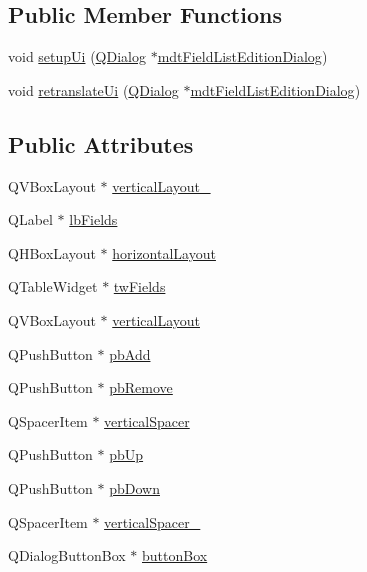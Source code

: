 \subsection*{Public Member Functions}
\begin{DoxyCompactItemize}
\item 
void \hyperlink{class_ui__mdt_field_list_edition_dialog_a4662dc90befa58da4568df605a7d26c9}{setup\-Ui} (\hyperlink{class_q_dialog}{Q\-Dialog} $\ast$\hyperlink{classmdt_field_list_edition_dialog}{mdt\-Field\-List\-Edition\-Dialog})
\item 
void \hyperlink{class_ui__mdt_field_list_edition_dialog_ac60ef5646ffc3019728f695a0b7cb2fd}{retranslate\-Ui} (\hyperlink{class_q_dialog}{Q\-Dialog} $\ast$\hyperlink{classmdt_field_list_edition_dialog}{mdt\-Field\-List\-Edition\-Dialog})
\end{DoxyCompactItemize}
\subsection*{Public Attributes}
\begin{DoxyCompactItemize}
\item 
Q\-V\-Box\-Layout $\ast$ \hyperlink{class_ui__mdt_field_list_edition_dialog_a4dfd8640ff6bd98a984e6e3180fa8dfb}{vertical\-Layout\-\_}
\item 
Q\-Label $\ast$ \hyperlink{class_ui__mdt_field_list_edition_dialog_aaa32a5c19424edcc47eb0939e7268f45}{lb\-Fields}
\item 
Q\-H\-Box\-Layout $\ast$ \hyperlink{class_ui__mdt_field_list_edition_dialog_a1803b58ae2f7ca22757db159d0c1c580}{horizontal\-Layout}
\item 
Q\-Table\-Widget $\ast$ \hyperlink{class_ui__mdt_field_list_edition_dialog_ab2c5007bf0c170cb34932ce743889b05}{tw\-Fields}
\item 
Q\-V\-Box\-Layout $\ast$ \hyperlink{class_ui__mdt_field_list_edition_dialog_ae01322016bbd7a90b42580eac4cef162}{vertical\-Layout}
\item 
Q\-Push\-Button $\ast$ \hyperlink{class_ui__mdt_field_list_edition_dialog_a98c057b1d437b4000da90eacacdc8f5f}{pb\-Add}
\item 
Q\-Push\-Button $\ast$ \hyperlink{class_ui__mdt_field_list_edition_dialog_a99ff300636037c36c9930d00b97b46f0}{pb\-Remove}
\item 
Q\-Spacer\-Item $\ast$ \hyperlink{class_ui__mdt_field_list_edition_dialog_a5c9c852b40e81c29b8ddba8f7ffae2a1}{vertical\-Spacer}
\item 
Q\-Push\-Button $\ast$ \hyperlink{class_ui__mdt_field_list_edition_dialog_a00ad9846b704acd0dabd77c23184f942}{pb\-Up}
\item 
Q\-Push\-Button $\ast$ \hyperlink{class_ui__mdt_field_list_edition_dialog_ab2231075e4b0d03e0d3e6549fe58efa8}{pb\-Down}
\item 
Q\-Spacer\-Item $\ast$ \hyperlink{class_ui__mdt_field_list_edition_dialog_a865d7bb493b2ae9c696ebf7f7f5b9b09}{vertical\-Spacer\-\_}
\item 
Q\-Dialog\-Button\-Box $\ast$ \hyperlink{class_ui__mdt_field_list_edition_dialog_a074a314fc3539819957aac83591d0ae3}{button\-Box}
\end{DoxyCompactItemize}


